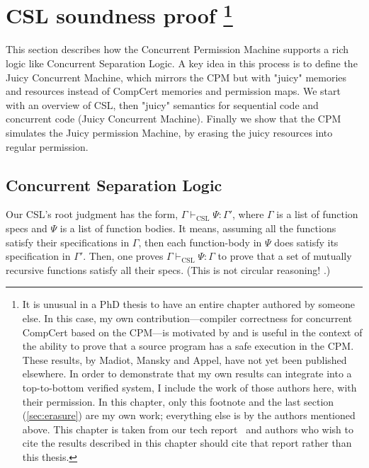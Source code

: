 \chapter[CSL soundness proof]{CSL soundness proof
\ifdefined\techreport
\else
\footnote{It is unusual in a PhD thesis to have an entire chapter authored by someone else.  In this case, my own contribution---compiler correctness for concurrent CompCert based on the CPM---is motivated by and is useful in the context of the ability to prove that a source program has a safe execution in the CPM.  These results, by Madiot, Mansky and Appel, have not yet been published elsewhere.  In order to demonstrate that my own results can integrate into a top-to-bottom verified system, I include the work of those authors here, with their permission. In this chapter, only this footnote and the last section (\ref{sec:erasure}) are my own work; everything else is by the authors mentioned above. This chapter is taken from our tech report \techlink\ and authors who wish to cite the results described in this chapter should cite that report rather than this thesis.
 }
\fi}
\label{sec:CSLsound}

 

This section describes how the Concurrent Permission Machine supports a rich logic like Concurrent Separation Logic. 
A key idea in this process is to define the Juicy Concurrent Machine, which mirrors the CPM but with "juicy" memories and resources instead of CompCert memories and permission maps.
We start with an overview of CSL, then "juicy" semantics for sequential code and concurrent code (Juicy Concurrent Machine). Finally we show that the CPM simulates the Juicy permission Machine, by erasing the juicy resources into regular permission.



\section{Concurrent Separation Logic}
\label{sec:csl}

Our CSL's root judgment has the form,
$\Gamma \vdash_\mathrm{CSL} \Psi:\Gamma'$,
where $\Gamma$ is a list of function specs
and $\Psi$ is a list of function bodies.
It means, assuming all the functions satisfy their specifications
in $\Gamma$, then each function-body in $\Psi$ does satisfy
its specification in $\Gamma'$.  Then, one proves
$\Gamma \vdash_\mathrm{CSL} \Psi:\Gamma$
to prove that a set of mutually recursive functions satisfy
all their specs.  (This is not circular reasoning!
\cite[Equation 81]{appel07:popl}.)

